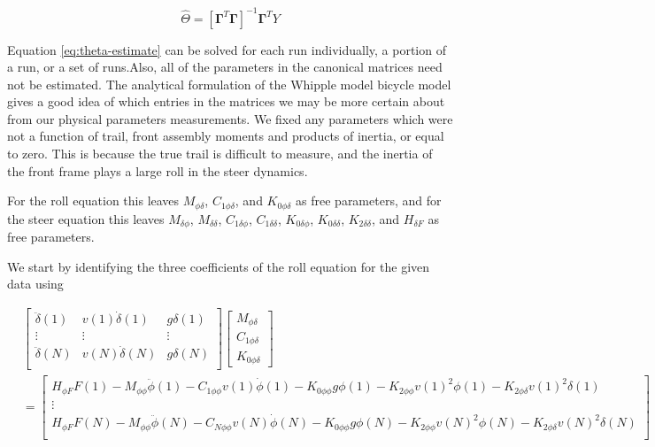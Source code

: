\documentclass[a4paper]{article}
\begin{document}
\begin{equation}
  \hat{\Theta} = [\mathbf{\Gamma}^T \mathbf{\Gamma}]^{-1} \mathbf{\Gamma}^T Y
  \label{eq:theta-estimate}
\end{equation}

Equation \ref{eq:theta-estimate} can be solved for each run individually, a
portion of a run, or a set of runs.Also, all of the parameters in the canonical matrices need not be estimated.
The analytical formulation of the Whipple model bicycle model
\cite{Meijaard2007} gives a good idea of which entries in the matrices we may
be more certain about from our physical parameters measurements. We fixed any
parameters which were not a function of trail, front assembly moments and
products of inertia, or equal to zero. This is because the true trail is
difficult to measure, and the inertia of the front frame plays a large roll in the
steer dynamics.

For the roll equation this leaves $M_{\phi\delta}$, $C_{1\phi\delta}$,
and $K_{0\phi\delta}$ as free parameters, and for the steer equation
this leaves $M_{\delta\phi}$, $M_{\delta\delta}$, $C_{1\delta\phi}$,
$C_{1\delta\delta}$, $K_{0\delta\phi}$, $K_{0\delta\delta}$,
$K_{2\delta\delta}$, and $H_{\delta F}$ as free parameters.

We start by identifying the three coefficients of the roll equation for
the given data using

\begin{align}
  &\begin{bmatrix}
     \ddot{\delta}(1) &
     v(1) \dot{\delta}(1) &
     g \delta(1) \\
     \vdots & \vdots & \vdots\\
     \ddot{\delta}(N) &
     v(N) \dot{\delta}(N) &
     g \delta(N) \\
  \end{bmatrix}
  \begin{bmatrix}
    M_{\phi\delta} \\
    C_{1\phi\delta} \\
    K_{0\phi\delta}
  \end{bmatrix}\\
  &=
  \begin{bmatrix}
    H_{\phi F} F(1)
    - M_{\phi\phi} \ddot{\phi}(1)
    - C_{1\phi\phi} v(1) \dot{\phi}(1)
    - K_{0\phi\phi} g \phi(1)
    - K_{2\phi\phi} v(1)^2 \phi(1)
    - K_{2\phi\delta} v(1)^2 \delta(1) \\
  \vdots\\
    H_{\phi F} F(N)
    - M_{\phi\phi} \ddot{\phi}(N)
    - C_{N\phi\phi} v(N) \dot{\phi}(N)
    - K_{0\phi\phi} g \phi(N)
    - K_{2\phi\phi} v(N)^2 \phi(N)
    - K_{2\phi\delta} v(N)^2 \delta(N) \\
  \end{bmatrix} \nonumber
\end{align}
\end{document}
